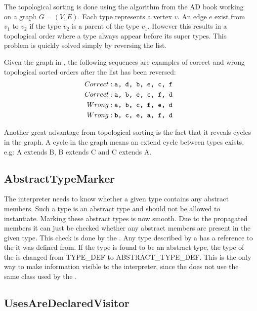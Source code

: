 The topological sorting is done using the algorithm from the AD book working on a graph $G = (V, E)$. Each type represents a vertex $v$. An edge $e$ exist from $v_1$ to $v_2$ if the type $v_2$ is a parent of the type $v_1$. However this results in a topological order where a type always appear before its super types. This problem is quickly solved simply by reversing the list.

Given the graph in \label{fig:topological}, the following sequences are examples of correct and wrong topological sorted orders after the list has been reversed:
\begin{align}
 Correct & : \texttt{a, d, b, e, c, f} \\
 Correct & : \texttt{a, b, e, c, f, d} \\
 Wrong & : \texttt{a, b, c, \textbf{f}, \textbf{e}, d} \\
 Wrong & : \texttt{\textbf{b}, c, e, \textbf{a}, f, d}
\end{align}



Another great advantage from topological sorting is the fact that it reveals cycles in the graph. A cycle in the graph means an extend cycle between types exists, e.g: A extends B, B extends C and C extends A.

\subsection{AbstractTypeMarker}
The interpreter needs to know whether a given type contains any abstract members. Such a type is an abstract type and should not be allowed to instantiate. Marking these abstract types is now smooth. Due to the propagated members it can just be checked whether any abstract members are present in the given type. This check is done by the . Any type described by a  has a reference to the  it was defined from. If the type is found to be an abstract type, the type of the  is changed from TYPE\_DEF to ABSTRACT\_TYPE\_DEF. This is the only way to make information visible to the interpreter, since the  does not use the same  class used by the .

\subsection{UsesAreDeclaredVisitor}
\label{sec:usesaredeclaredvisitor}

